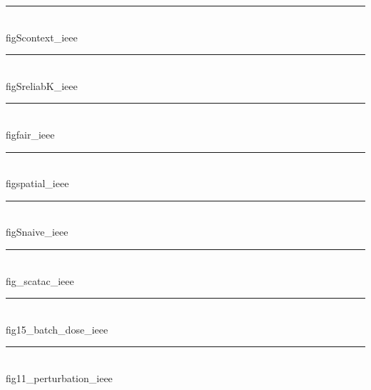 \documentclass[journal]{IEEEtran}
\newlength{\FW}\setlength{\FW}{7.0in}
\newcommand{\showfig}[1]{%
  \par\noindent\rule{\FW}{0.4pt}\\[-1pt]
  {\ttfamily\scriptsize #1}\\[2pt]
  \fbox{\resizebox{\FW}{!}{}}\par\clearpage}
\begin{document}
\pagestyle{empty}
\showfig{figScontext_ieee}
\showfig{figSreliabK_ieee}
\showfig{figfair_ieee}
\showfig{figspatial_ieee}
\showfig{figSnaive_ieee}
\showfig{fig_scatac_ieee}
\showfig{fig15_batch_dose_ieee}
\showfig{fig11_perturbation_ieee}
\end{document}
